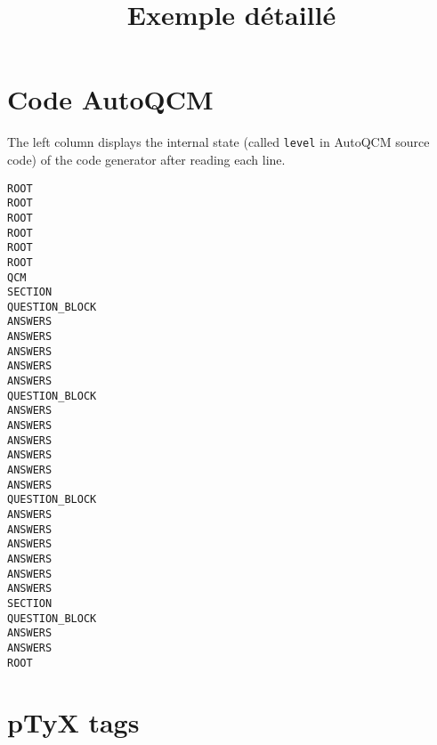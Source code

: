 \documentclass[a4paper,10pt]{article}
\title{Exemple détaillé}
\author{}
\begin{document}
\section{Code AutoQCM}

The left column displays the internal state (called \texttt{level} in AutoQCM source code) of the code generator     after reading each line.

\bigskip

\begin{minipage}{.17\linewidth}
\begin{lstlisting}
ROOT
ROOT
ROOT
ROOT
ROOT
ROOT
QCM
SECTION
QUESTION_BLOCK
ANSWERS
ANSWERS
ANSWERS
ANSWERS
ANSWERS
QUESTION_BLOCK
ANSWERS
ANSWERS
ANSWERS
ANSWERS
ANSWERS
ANSWERS
QUESTION_BLOCK
ANSWERS
ANSWERS
ANSWERS
ANSWERS
ANSWERS
ANSWERS
SECTION
QUESTION_BLOCK
ANSWERS
ANSWERS
ROOT
\end{lstlisting}
\end{minipage}
\begin{minipage}{.5\linewidth}
%

\end{minipage}




\section{pTyX tags}
\end{document}

